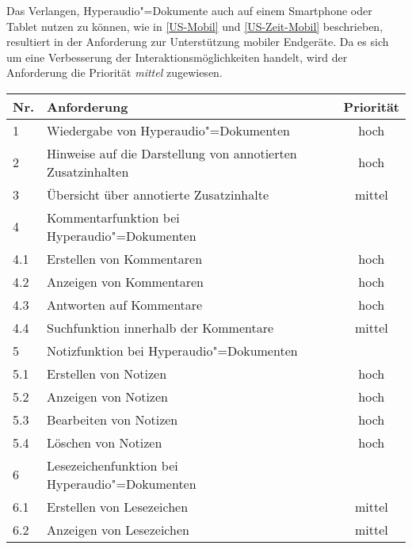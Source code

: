 Das Verlangen, Hyperaudio"=Dokumente auch auf einem Smartphone oder Tablet nutzen zu können, wie in \ref{US-Mobil} und \ref{US-Zeit-Mobil} beschrieben, resultiert in der Anforderung zur Unterstützung mobiler Endgeräte. Da es sich um eine Verbesserung der Interaktionsmöglichkeiten handelt, wird der Anforderung die Priorität \textit{mittel} zugewiesen.

\begin{table}[!ht]
\def\arraystretch{1.4}

\begin{tabularx}{\textwidth}{lXc}      
    \hline
    Nr. & Anforderung & Priorität
    \\\hline
    1 & Wiedergabe von Hyperaudio"=Dokumenten & hoch\\
    2 & Hinweise auf die Darstellung von annotierten Zusatzinhalten & hoch\\
    3 & Übersicht über annotierte Zusatzinhalte & mittel\\
    4 & Kommentarfunktion bei Hyperaudio"=Dokumenten & \\
    4.1 & \hspace*{0.5cm} Erstellen von Kommentaren & hoch\\
    4.2 & \hspace*{0.5cm} Anzeigen von Kommentaren & hoch\\
    4.3 & \hspace*{0.5cm} Antworten auf Kommentare & hoch\\
    4.4 & \hspace*{0.5cm} Suchfunktion innerhalb der Kommentare & mittel\\ 
    5 & Notizfunktion bei Hyperaudio"=Dokumenten & \\
    5.1 & \hspace*{0.5cm} Erstellen von Notizen & hoch\\
    5.2 & \hspace*{0.5cm} Anzeigen von Notizen & hoch\\
    5.3 & \hspace*{0.5cm} Bearbeiten von Notizen & hoch\\
   	5.4 & \hspace*{0.5cm} Löschen von Notizen & hoch\\
    6 & Lesezeichenfunktion bei Hyperaudio"=Dokumenten & \\
    6.1 & \hspace*{0.5cm} Erstellen von Lesezeichen & mittel\\
    6.2 & \hspace*{0.5cm} Anzeigen von Lesezeichen & mittel\\

\end{tabularx}
\end{table}
